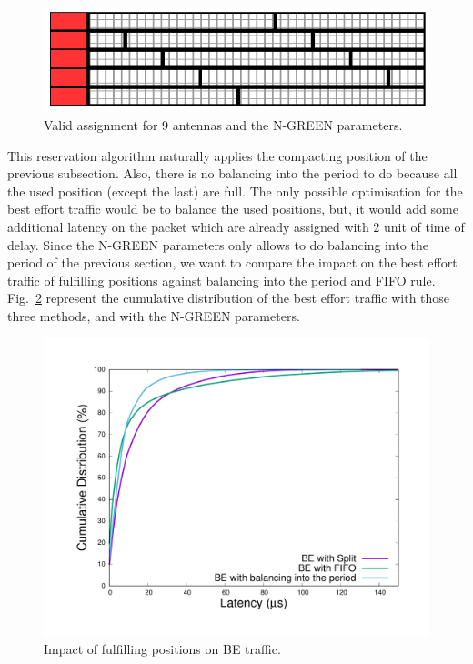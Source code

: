 \documentclass[10pt, conference, letterpaper]{IEEEtran}
\begin{document}
\begin{figure}[h!]
\begin{center}   

      \includegraphics[scale=0.8]{split}
     \caption{Valid assignment for $9$ antennas and the N-GREEN parameters.}   \label{fig:split}
\end{center}
  \end{figure}
  
  This reservation algorithm naturally applies the compacting position of the previous subsection. Also, there is no balancing into the period to do because all the used position (except the last) are full. The only possible optimisation for the best effort traffic would be to balance the used positions, but, it would add some additional latency on the packet which are already assigned with $2$ unit of time of delay.
  Since the N-GREEN parameters only allows to do balancing into the period of the previous section, we want to compare the impact on the best effort traffic of fulfilling positions against balancing into the period and FIFO rule. 
Fig.~\ref{fig:splitres} represent the cumulative distribution of the best effort traffic with those three methods, and with the N-GREEN parameters.


\begin{figure}[h!]
\begin{center}   

      \includegraphics[scale=0.25]{splitres}
     \caption{Impact of fulfilling positions on BE traffic.}   \label{fig:splitres}
\end{center}
  \end{figure}
  
\end{document}
